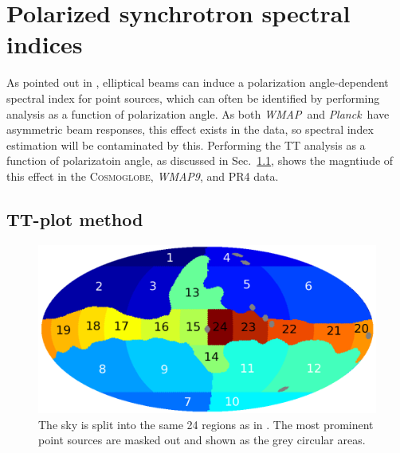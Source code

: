 \documentclass[twocolumn]{../../common/aa}
\def\WMAP{\emph{WMAP}}
\def\WMAPnine{\emph{WMAP9}}
\def\Planck{\emph{Planck}}
\newcommand{\cosmoglobe}{\textsc{Cosmoglobe}}
\begin{document}
\section{Polarized synchrotron spectral indices}

\label{sec:specvar}

As pointed out in \citet{wehus:2013}, elliptical beams can induce a polarization angle-dependent spectral index for point sources, which can often be identified by performing analysis as a function of polarization angle. As both \WMAP\ and \Planck\ have asymmetric beam responses, this effect exists in the data, so spectral index estimation will be contaminated by this. Performing the TT analysis as a function of polarizatoin angle, as discussed in Sec.~\ref{sec:tt_plot}, shows the magntiude of this effect in the \cosmoglobe, \WMAPnine, and PR4 data.

\subsection{TT-plot method}
\label{sec:tt_plot}



\begin{figure}
        \centering
        \includegraphics[width=\linewidth]{figures/utnymaske_tall_converted.pdf}
        \caption{The sky is split into the same 24 regions as in \citet{fuskeland2014}. The most prominent point sources are masked out and shown as the grey circular areas.
        }
        \label{fig:regions}
\end{figure}
\end{document}
